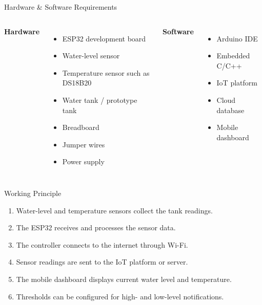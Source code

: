 \documentclass[aspectratio=169]{beamer}
\begin{document}
\begin{frame}{Hardware \& Software Requirements}

\begin{columns}


\textbf{Hardware}

\begin{itemize}
    \item ESP32 development board
    \item Water-level sensor
    \item Temperature sensor such as DS18B20
    \item Water tank / prototype tank
    \item Breadboard
    \item Jumper wires
    \item Power supply
\end{itemize}


\textbf{Software}

\begin{itemize}
    \item Arduino IDE
    \item Embedded C/C++
    \item IoT platform
    \item Cloud database
    \item Mobile dashboard
\end{itemize}

\end{columns}

\end{frame}


\begin{frame}{Working Principle}

\begin{enumerate}

    \item Water-level and temperature sensors collect the tank
    readings.

    \item The ESP32 receives and processes the sensor data.

    \item The controller connects to the internet through Wi-Fi.

    \item Sensor readings are sent to the IoT platform or server.

    \item The mobile dashboard displays current water level and
    temperature.

    \item Thresholds can be configured for high- and low-level
    notifications.

\end{enumerate}

\end{frame}
\end{document}
